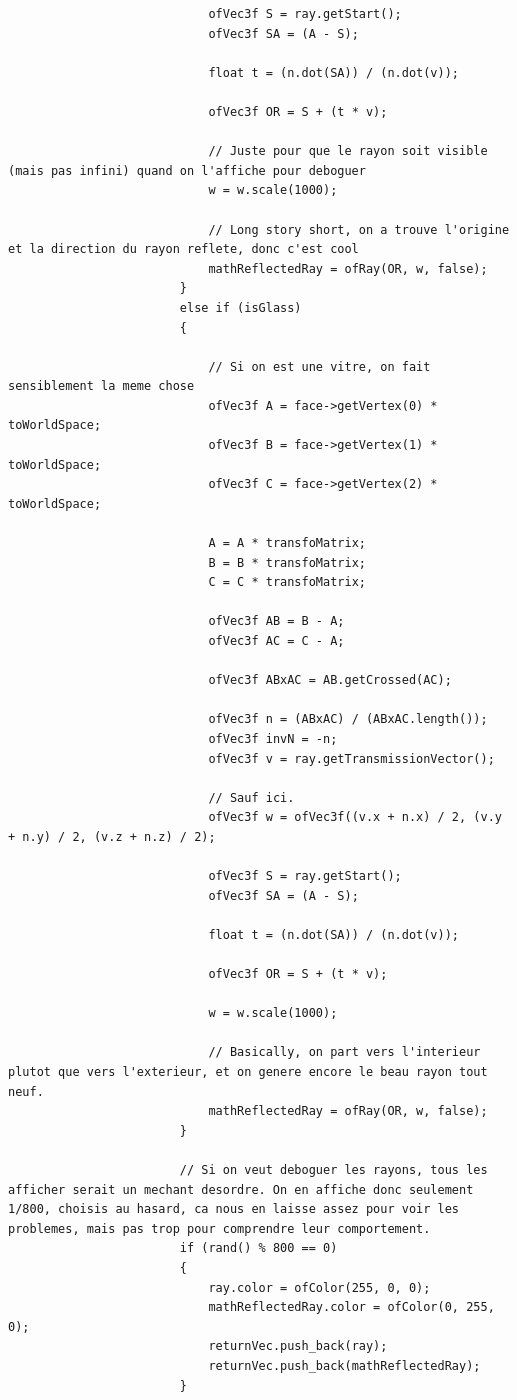 \begin{lstlisting}
							ofVec3f S = ray.getStart();
							ofVec3f SA = (A - S);
							
							float t = (n.dot(SA)) / (n.dot(v));
							
							ofVec3f OR = S + (t * v);
							
							// Juste pour que le rayon soit visible (mais pas infini) quand on l'affiche pour deboguer
							w = w.scale(1000);
							
							// Long story short, on a trouve l'origine et la direction du rayon reflete, donc c'est cool
							mathReflectedRay = ofRay(OR, w, false);
						}
						else if (isGlass)
						{
						
							// Si on est une vitre, on fait sensiblement la meme chose
							ofVec3f A = face->getVertex(0) * toWorldSpace;
							ofVec3f B = face->getVertex(1) * toWorldSpace;
							ofVec3f C = face->getVertex(2) * toWorldSpace;
							
							A = A * transfoMatrix;
							B = B * transfoMatrix;
							C = C * transfoMatrix;
							
							ofVec3f AB = B - A;
							ofVec3f AC = C - A;
							
							ofVec3f ABxAC = AB.getCrossed(AC);
							
							ofVec3f n = (ABxAC) / (ABxAC.length());
							ofVec3f invN = -n;
							ofVec3f v = ray.getTransmissionVector();
							
							// Sauf ici.
							ofVec3f w = ofVec3f((v.x + n.x) / 2, (v.y + n.y) / 2, (v.z + n.z) / 2);
							
							ofVec3f S = ray.getStart();
							ofVec3f SA = (A - S);
							
							float t = (n.dot(SA)) / (n.dot(v));
							
							ofVec3f OR = S + (t * v);
							
							w = w.scale(1000);
							
							// Basically, on part vers l'interieur plutot que vers l'exterieur, et on genere encore le beau rayon tout neuf.
							mathReflectedRay = ofRay(OR, w, false);
						}
						
						// Si on veut deboguer les rayons, tous les afficher serait un mechant desordre. On en affiche donc seulement 1/800, choisis au hasard, ca nous en laisse assez pour voir les problemes, mais pas trop pour comprendre leur comportement.
						if (rand() % 800 == 0)
						{
							ray.color = ofColor(255, 0, 0);
							mathReflectedRay.color = ofColor(0, 255, 0);
							returnVec.push_back(ray);
							returnVec.push_back(mathReflectedRay);
						}
						

\end{lstlisting}
